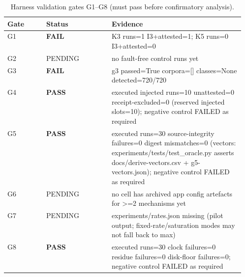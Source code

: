 
\begin{table}[htbp]
\centering
\small
\caption{Harness validation gates G1–G8 (must pass before confirmatory analysis).}
\label{tab:validation}
\begin{tabular}{llp{0.56\linewidth}}
\toprule
\textbf{Gate} & \textbf{Status} & \textbf{Evidence} \\
\midrule
G1 & \textbf{FAIL} & K3 runs=1 I3+attested=1; K5 runs=0 I3+attested=0 \\
G2 & PENDING & no fault-free control runs yet \\
G3 & \textbf{FAIL} & g3 passed=True corpora=[] classes=None detected=720/720 \\
G4 & \textbf{PASS} & executed injected runs=10 unattested=0 receipt-excluded=0 (reserved injected slots=10); negative control FAILED as required \\
G5 & \textbf{PASS} & executed runs=30 source-integrity failures=0 digest mismatches=0 (vectors: experiments/tests/test\_oracle.py asserts docs/derive-vectors.csv + g5-vectors.json); negative control FAILED as required \\
G6 & PENDING & no cell has archived app config artefacts for >=2 mechanisms yet \\
G7 & PENDING & experiments/rates.json missing (pilot output; fixed-rate/saturation modes may not fall back to max) \\
G8 & \textbf{PASS} & executed runs=30 clock failures=0 residue failures=0 disk-floor failures=0; negative control FAILED as required \\
\bottomrule
\end{tabular}
\end{table}
